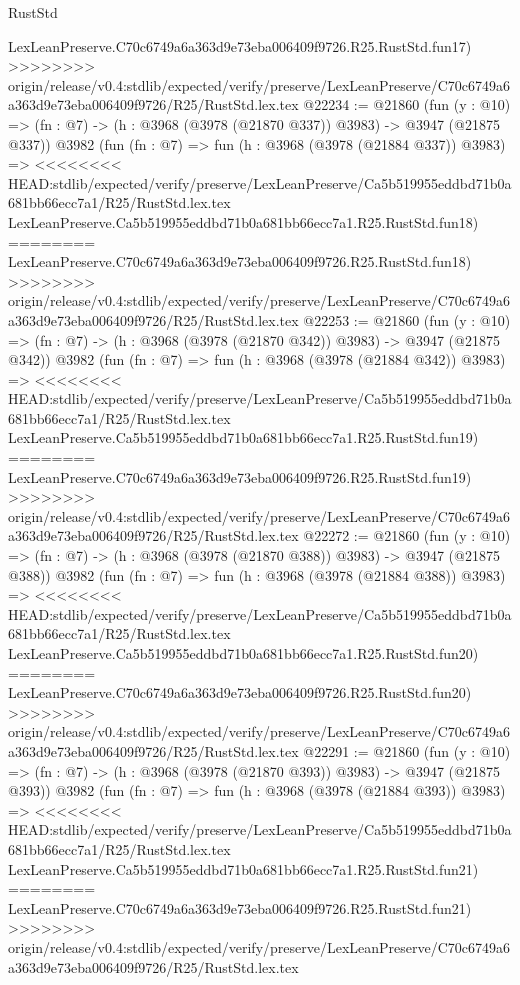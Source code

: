 \begin{lexlean}{RustStd}
\begin{coremodule}
{\begin{coremodule}
{{{{{{{{{{{{{{{{{{{{{{{{{{{{{{{{{{{{{{    LexLeanPreserve.C70c6749a6a363d9e73eba006409f9726.R25.RustStd.fun17)
>>>>>>>> origin/release/v0.4:stdlib/expected/verify/preserve/LexLeanPreserve/C70c6749a6a363d9e73eba006409f9726/R25/RustStd.lex.tex
@22234 := @21860
    (fun (y : @10) => (fn : @7) -> (h : @3968 (@3978 (@21870 @337)) @3983) -> @3947 (@21875 @337))
    @3982
    (fun (fn : @7) =>
    fun (h : @3968 (@3978 (@21884 @337)) @3983) =>
<<<<<<<< HEAD:stdlib/expected/verify/preserve/LexLeanPreserve/Ca5b519955eddbd71b0a681bb66ecc7a1/R25/RustStd.lex.tex
    LexLeanPreserve.Ca5b519955eddbd71b0a681bb66ecc7a1.R25.RustStd.fun18)
========
    LexLeanPreserve.C70c6749a6a363d9e73eba006409f9726.R25.RustStd.fun18)
>>>>>>>> origin/release/v0.4:stdlib/expected/verify/preserve/LexLeanPreserve/C70c6749a6a363d9e73eba006409f9726/R25/RustStd.lex.tex
@22253 := @21860
    (fun (y : @10) => (fn : @7) -> (h : @3968 (@3978 (@21870 @342)) @3983) -> @3947 (@21875 @342))
    @3982
    (fun (fn : @7) =>
    fun (h : @3968 (@3978 (@21884 @342)) @3983) =>
<<<<<<<< HEAD:stdlib/expected/verify/preserve/LexLeanPreserve/Ca5b519955eddbd71b0a681bb66ecc7a1/R25/RustStd.lex.tex
    LexLeanPreserve.Ca5b519955eddbd71b0a681bb66ecc7a1.R25.RustStd.fun19)
========
    LexLeanPreserve.C70c6749a6a363d9e73eba006409f9726.R25.RustStd.fun19)
>>>>>>>> origin/release/v0.4:stdlib/expected/verify/preserve/LexLeanPreserve/C70c6749a6a363d9e73eba006409f9726/R25/RustStd.lex.tex
@22272 := @21860
    (fun (y : @10) => (fn : @7) -> (h : @3968 (@3978 (@21870 @388)) @3983) -> @3947 (@21875 @388))
    @3982
    (fun (fn : @7) =>
    fun (h : @3968 (@3978 (@21884 @388)) @3983) =>
<<<<<<<< HEAD:stdlib/expected/verify/preserve/LexLeanPreserve/Ca5b519955eddbd71b0a681bb66ecc7a1/R25/RustStd.lex.tex
    LexLeanPreserve.Ca5b519955eddbd71b0a681bb66ecc7a1.R25.RustStd.fun20)
========
    LexLeanPreserve.C70c6749a6a363d9e73eba006409f9726.R25.RustStd.fun20)
>>>>>>>> origin/release/v0.4:stdlib/expected/verify/preserve/LexLeanPreserve/C70c6749a6a363d9e73eba006409f9726/R25/RustStd.lex.tex
@22291 := @21860
    (fun (y : @10) => (fn : @7) -> (h : @3968 (@3978 (@21870 @393)) @3983) -> @3947 (@21875 @393))
    @3982
    (fun (fn : @7) =>
    fun (h : @3968 (@3978 (@21884 @393)) @3983) =>
<<<<<<<< HEAD:stdlib/expected/verify/preserve/LexLeanPreserve/Ca5b519955eddbd71b0a681bb66ecc7a1/R25/RustStd.lex.tex
    LexLeanPreserve.Ca5b519955eddbd71b0a681bb66ecc7a1.R25.RustStd.fun21)
========
    LexLeanPreserve.C70c6749a6a363d9e73eba006409f9726.R25.RustStd.fun21)
>>>>>>>> origin/release/v0.4:stdlib/expected/verify/preserve/LexLeanPreserve/C70c6749a6a363d9e73eba006409f9726/R25/RustStd.lex.tex
}}}}}}}}}}}}}}}}}}}}}}}}}}}}}}}}}}}}}}
\end{coremodule}}
\end{coremodule}
\end{lexlean}
